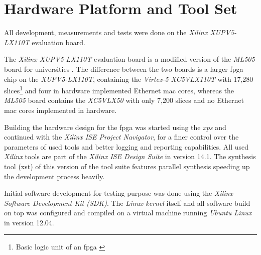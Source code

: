 \section{Hardware Platform and Tool Set}

All development, measurements and tests were done on the \textit{Xilinx XUPV5-LX110T} evaluation board.

The \textit{Xilinx XUPV5-LX110T} evaluation board is a modified version of the \textit{ML505} board for universities \cite{xupv5manual}. The difference between the two boards is a larger \gls{fpga} chip on the \textit{XUPV5-LX110T}, containing the \textit{Virtex-5 XC5VLX110T} with 17,280 slices\footnote{Basic logic unit of an \gls{fpga} \cite{fpga_ni}} and four in hardware implemented Ethernet \gls{mac} cores, whereas the \textit{ML505} board contains the \textit{XC5VLX50} with only 7,200 slices and no Ethernet \gls{mac} cores implemented in hardware.

Building the hardware design for the \gls{fpga} was started using the \textit{\gls{xps}} and continued with the \textit{Xilinx ISE Project Navigator}, for a finer control over the parameters of used tools and better logging and reporting capabilities. All used \textit{Xilinx} tools are part of the \textit{Xilinx ISE Design Suite} in version 14.1. The synthesis tool (xst) of this version of the tool suite features parallel synthesis speeding up the development process heavily.

Initial software development for testing purpose was done using the \textit{Xilinx Software Development Kit (SDK)}. The \textit{Linux kernel} itself and all software build on top was configured and compiled on a virtual machine running \textit{Ubuntu Linux} in version 12.04.